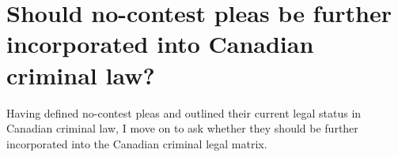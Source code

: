 \chapter{Should no-contest pleas be further incorporated into Canadian criminal law?}

Having defined no-contest pleas and outlined their current legal status in Canadian criminal law, I move on to ask whether they should be further incorporated into the Canadian criminal legal matrix. 